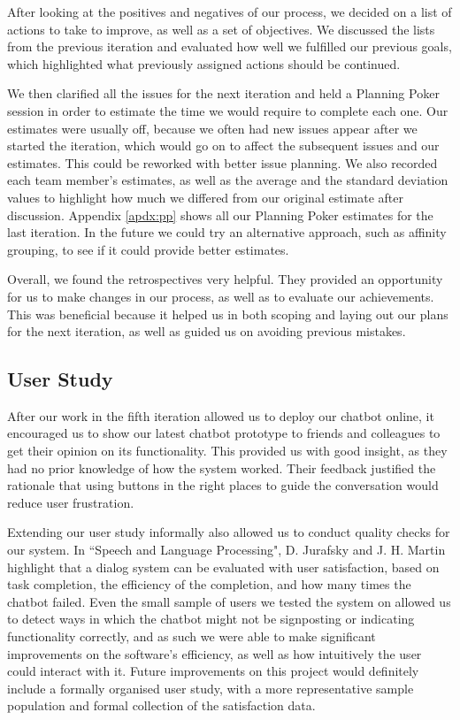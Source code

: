 \documentclass{l3proj}
\begin{document}
After looking at the positives and negatives of our process, we decided on a list of actions to take to improve, as well as a set of objectives. We discussed the lists from the previous iteration and evaluated how well we fulfilled our previous goals, which highlighted what previously assigned actions should be continued.

We then clarified all the issues for the next iteration and held a Planning Poker session in order to estimate the time we would require to complete each one. Our estimates were usually off, because we often had new issues appear after we started the iteration, which would go on to affect the subsequent issues and our estimates. This could be reworked with better issue planning. We also recorded each team member's estimates, as well as the average and the standard deviation values to highlight how much we differed from our original estimate after discussion. Appendix \ref{apdx:pp} shows all our Planning Poker estimates for the last iteration. In the future we could try an alternative approach, such as affinity grouping\cite{agileestimationtechniques:Sliger}, to see if it could provide better estimates.

Overall, we found the retrospectives very helpful. They provided an opportunity for us to make changes in our process, as well as to evaluate our achievements. This was beneficial because it helped us in both scoping and laying out our plans for the next iteration, as well as guided us on avoiding previous mistakes.

\subsection{User Study}

After our work in the fifth iteration allowed us to deploy our chatbot online, it encouraged us to show our latest chatbot prototype to friends and colleagues to get their opinion on its functionality. This provided us with good insight, as they had no prior knowledge of how the system worked. Their feedback justified the rationale that using buttons in the right places to guide the conversation would reduce user frustration.

Extending our user study informally also allowed us to conduct quality checks for our system. In ``Speech and Language Processing", D. Jurafsky and J. H. Martin highlight that a dialog system can be evaluated with user satisfaction, based on task completion, the efficiency of the completion, and how many times the chatbot failed\cite{SLP:Jurafsky}. Even the small sample of users we tested the system on allowed us to detect ways in which the chatbot might not be signposting or indicating functionality correctly, and as such we were able to make significant improvements on the software's efficiency, as well as how intuitively the user could interact with it. Future improvements on this project would definitely include a formally organised user study, with a more representative sample population and formal collection of the satisfaction data.
\end{document}
